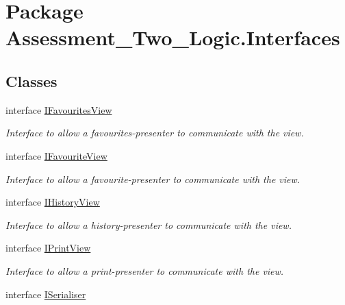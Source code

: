 \hypertarget{namespace_assessment___two___logic_1_1_interfaces}{
\section{Package Assessment\_\-Two\_\-Logic.Interfaces}
\label{namespace_assessment___two___logic_1_1_interfaces}
}
\subsection*{Classes}
\begin{DoxyCompactItemize}
\item 
interface \hyperlink{interface_assessment___two___logic_1_1_interfaces_1_1_i_favourites_view}{IFavouritesView}
\begin{DoxyCompactList}\small\item\em Interface to allow a favourites-\/presenter to communicate with the view. \item\end{DoxyCompactList}\item 
interface \hyperlink{interface_assessment___two___logic_1_1_interfaces_1_1_i_favourite_view}{IFavouriteView}
\begin{DoxyCompactList}\small\item\em Interface to allow a favourite-\/presenter to communicate with the view. \item\end{DoxyCompactList}\item 
interface \hyperlink{interface_assessment___two___logic_1_1_interfaces_1_1_i_history_view}{IHistoryView}
\begin{DoxyCompactList}\small\item\em Interface to allow a history-\/presenter to communicate with the view. \item\end{DoxyCompactList}\item 
interface \hyperlink{interface_assessment___two___logic_1_1_interfaces_1_1_i_print_view}{IPrintView}
\begin{DoxyCompactList}\small\item\em Interface to allow a print-\/presenter to communicate with the view. \item\end{DoxyCompactList}\item 
interface \hyperlink{interface_assessment___two___logic_1_1_interfaces_1_1_i_serialiser-g}{ISerialiser}

\end{DoxyCompactItemize}

